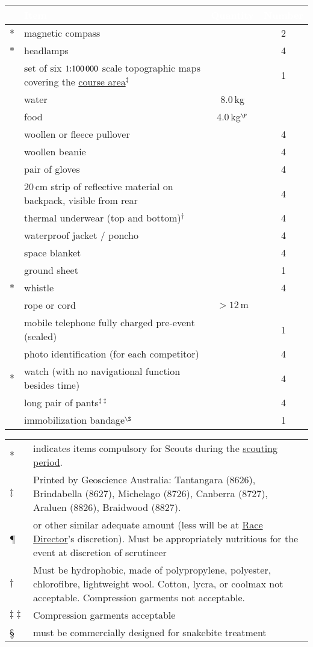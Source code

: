 \documentclass[12pt]{report}
\newcommand{\hyplink}[1]{\hyperlink{#1}{{#1}}}
\newcommand{\coursearea}{\hyplink{course area}}
\newcommand{\RaceDirector}{\hyplink{Race Director}}
\newcommand{\scoutingperiod}{\hyplink{scouting period}}
\begin{document}
  \begin{table}[H]
  \begin{tabular}
    {clcc} \rowcolor{black}
    &\textcolor{white}{\textbf{Item}} & \textcolor{white}{\textbf{Quantity}}&\textcolor{white}{\textbf{Number}}\\
    \hline
    $*$ & magnetic compass & & 2\\
    $*$&headlamps & & 4\\
    &set of six $\mbox{1:100\,000}$ scale topographic maps covering the \coursearea$^\ddag$ & &1\\
    &water & 8.0\,kg & \\
    &food &  4.0\,kg$^{\P}$ & \\
    &woollen or fleece pullover & & 4\\
    &woollen beanie & & 4\\
    &pair of gloves & & 4\\
    &20\,cm strip of reflective material on backpack, visible from rear &  &4\\
    &thermal underwear (top and bottom)$^\dag$ & & 4\\
    &waterproof jacket / poncho & & 4\\
    &space blanket & & 4\\
    &ground sheet & & 1\\
    $*$&whistle & & 4\\
    &rope or cord & $>12\,\mathrm{m}$ &\\
    &mobile telephone fully charged pre-event (sealed)& & 1\\
    &photo identification (for each competitor) & & 4\\
    $*$&watch (with no navigational function besides time) & & 4\\
    &long pair of pants$^{\ddag\ddag}$ & & 4\\
    & immobilization  bandage$^{\S}$& & 1
  \end{tabular}\vspace{12pt}
  \begin{tabular}{lp{15cm}}
  $*$&{\small indicates items compulsory for Scouts during the \scoutingperiod.}\\
  $\ddag$&{\small Printed by Geoscience Australia: Tantangara (8626), Brindabella (8627), Michelago (8726), Canberra (8727), Araluen (8826), Braidwood (8827).}\\
  \P &{\small or other similar adequate amount (less will be at \RaceDirector's discretion). Must be appropriately nutritious for the event at discretion of scrutineer}\\
  $\dag$&{\small Must be hydrophobic, made of polypropylene, polyester, chlorofibre, lightweight wool. Cotton, lycra, or coolmax not acceptable. Compression garments not acceptable.}\\
  $\ddag\ddag$&{\small Compression garments acceptable}\\
  \S & {\small must be commercially designed for snakebite treatment}
  \end{tabular}
  \end{table}
\end{document}
